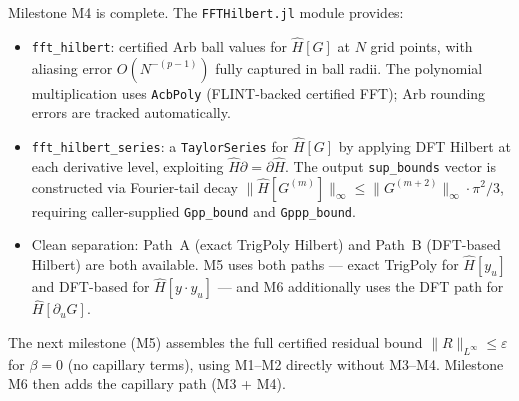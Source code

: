 \documentclass[11pt]{article}
\theoremstyle{definition}
\begin{document}
Milestone M4 is complete.  The \texttt{FFTHilbert.jl} module provides:
\begin{itemize}
  \item \texttt{fft\_hilbert}: certified Arb ball values for $\hat H[G]$ at $N$ grid
        points, with aliasing error $O(N^{-(p-1)})$ fully captured in ball radii.
        The polynomial multiplication uses \texttt{AcbPoly} (FLINT-backed certified
        FFT); Arb rounding errors are tracked automatically.
  \item \texttt{fft\_hilbert\_series}: a \texttt{TaylorSeries} for $\hat H[G]$
        by applying DFT Hilbert at each derivative level, exploiting $\hat H \partial = \partial \hat H$.
        The output \texttt{sup\_bounds} vector is constructed via Fourier-tail
        decay $\|\hat H[G^{(m)}]\|_\infty \le \|G^{(m+2)}\|_\infty \cdot \pi^2/3$,
        requiring caller-supplied \texttt{Gpp\_bound} and \texttt{Gppp\_bound}.
  \item Clean separation: Path~A (exact TrigPoly Hilbert) and Path~B (DFT-based Hilbert)
        are both available.  M5 uses both paths --- exact TrigPoly for $\hat H[y_u]$
        and DFT-based for $\hat H[y\cdot y_u]$ --- and M6 additionally uses the
        DFT path for $\hat H[\partial_u G]$.
\end{itemize}

The next milestone (M5) assembles the full certified residual bound
$\|R\|_{L^\infty} \le \varepsilon$ for $\beta = 0$ (no capillary terms),
using M1--M2 directly without M3--M4.
Milestone M6 then adds the capillary path (M3 + M4).
\end{document}
